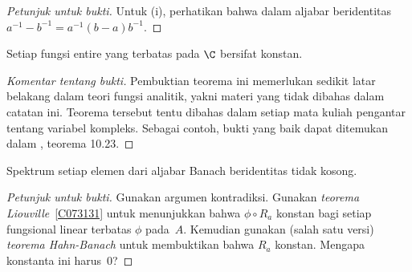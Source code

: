 \begin{proof}[\emph{Petunjuk untuk bukti}] Untuk (i), perhatikan bahwa dalam aljabar beridentitas $a^{-1} - b^{-1}
= a^{-1}(b - a)b^{-1}$.   \ns
\end{proof}

\begin{thm}[Liouville]\label{C073131} Setiap fungsi entire yang terbatas pada $\C$ bersifat konstan.
\end{thm}

\begin{proof}[\emph{Komentar tentang bukti}] Pembuktian teorema ini memerlukan sedikit latar belakang
dalam teori fungsi analitik, yakni materi yang tidak dibahas dalam catatan ini. Teorema
tersebut tentu dibahas dalam setiap mata kuliah pengantar tentang variabel kompleks. Sebagai contoh, bukti yang
baik dapat ditemukan dalam \cite{Rudin:1987}, teorema 10.23.   \ns
\end{proof}

\begin{prop}\label{C073134} Spektrum setiap elemen dari aljabar Banach beridentitas tidak kosong.
\end{prop}

\begin{proof}[\emph{Petunjuk untuk bukti}] Gunakan argumen kontradiksi. Gunakan \emph{teorema Liouville}~\ref{C073131}
untuk menunjukkan bahwa $\phi \circ R_a$ konstan bagi setiap fungsional linear terbatas $\phi$ pada~$A$. Kemudian gunakan
(salah satu versi) \emph{teorema Hahn-Banach} untuk membuktikan bahwa $R_a$ konstan. Mengapa konstanta ini harus~$0$?   \ns
\end{proof}
